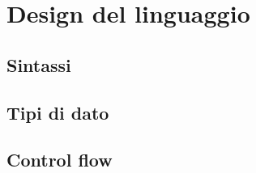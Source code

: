 
\chapter{Design del linguaggio}
\label{chap:design-del-linguaggio}

\section{Sintassi}
\label{sec:sintassi}

\section{Tipi di dato}
\label{sec:tipi-di-dato}

\section{Control flow}
\label{sec:control-flow}
